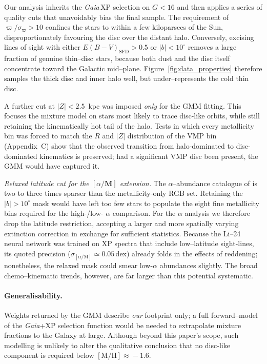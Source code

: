 \documentclass[a4paper,12pt]{article}
\begin{document}
Our analysis inherits the \textit{Gaia}\,XP selection on
$G\!<\!16$ and then applies a series of quality cuts that
unavoidably bias the final sample.  
The requirement of \mbox{$\varpi/\sigma_\varpi>10$} confines the stars
to within a few kiloparsecs of the Sun, disproportionately favouring
the disc over the distant halo.  
Conversely, excising lines of sight with either
$E(B{-}V)_{\mathrm{SFD}}>0.5$ or $|b|<10^{\circ}$ removes a large
fraction of genuine thin–disc stars, because both dust and the disc
itself concentrate toward the Galactic mid–plane.
Figure~\ref{fig:data_properties} therefore samples the thick disc
and inner halo well, but under–represents the cold thin disc.

A further cut at \mbox{$|Z|<2.5$ kpc} was imposed \emph{only} for the
GMM fitting.  This focuses the mixture model on stars most likely to
trace disc-like orbits, while still retaining the kinematically hot
tail of the halo.  Tests in which every metallicity bin was forced to
match the $R$ and $|Z|$ distribution of the VMP bin (Appendix~C)
show that the observed transition from halo-dominated to
disc-dominated kinematics is preserved; had a significant VMP disc
been present, the GMM would have captured it.

\smallskip
\noindent\textit{Relaxed latitude cut for the
$[\alpha/\mathbf{M}]$ extension.}  
The $\alpha$–abundance catalogue of \citet{Li2024} is two to three
times sparser than the metallicity-only RGB set.  
Retaining the $|b|>10^{\circ}$ mask would have left too few stars to
populate the eight fine metallicity bins required for the high-/low-
$\alpha$ comparison.  For the $\alpha$ analysis we therefore drop the
latitude restriction, accepting a larger and more spatially varying
extinction correction in exchange for sufficient statistics.  
Because the Li--24 neural network was trained on XP spectra that
include low–latitude sight-lines, its quoted precision
($\sigma_{[\alpha/\mathrm{M}]}\!\simeq\!0.05$\,dex) already folds in
the effects of reddening; nonetheless, the relaxed mask could smear
low-$\alpha$ abundances slightly.  The broad chemo–kinematic trends,
however, are far larger than this potential systematic.

\paragraph{Generalisability.}
Weights returned by the GMM describe \emph{our} footprint only; a full
forward–model of the \textit{Gaia}+XP selection function would be
needed to extrapolate mixture fractions to the Galaxy at large.
Although beyond this paper’s scope, such modelling is unlikely to
alter the qualitative conclusion that no disc-like component is
required below $[\mathrm{M/H}]\!\approx\!-1.6$.
\end{document}
